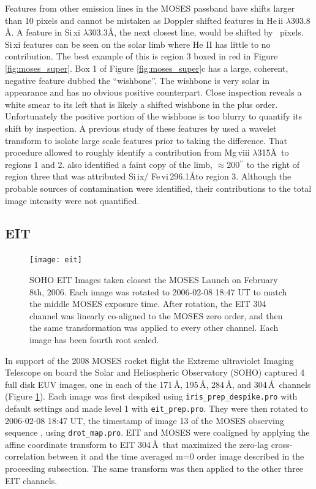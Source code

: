 		
		Features from other emission lines in the MOSES passband have shifts larger than 10 pixels and cannot be mistaken as Doppler shifted features in He\,{\sc ii}  $\lambda303.8$ \AA. 
		A feature in Si\,{\sc xi} $\lambda$303.3\AA, the next closest line, would be shifted by \sixipix\ pixels. 
		Si\,{\sc xi} features can be seen on the solar limb where He II has little to no contribution. 
		The best example of this is region 3 boxed in red in Figure \ref{fig:moses_super}.  
		Box 1 of Figure \ref{fig:moses_super}c has a large, coherent, negative feature dubbed the ``wishbone''.  
		The wishbone is very solar in appearance and has no obvious positive counterpart.  
		Close inspection reveals a white smear to its left that is likely a shifted wishbone in the plus order.  
		Unfortunately the positive portion of the wishbone is too blurry to quantify its shift by inspection. 
		A previous study of these features by \citet{Rust2017} used a wavelet transform to isolate large scale features prior to taking the difference.  
		That procedure allowed \citet{Rust2017} to roughly identify a contribution from Mg\,{\sc viii} $\lambda$315\AA \  to regions 1 and 2.
		\citet{Rust2017} also identified a faint copy of the limb, $\approx$200$^{\prime\prime}$ to the right of region three that was attributed Si\,{\sc ix}/ Fe\,{\sc vi}\,296.1\AA to region 3.
		Although the probable sources of contamination were identified, their contributions to the total image intensity were not quantified.
	
	\subsection{EIT}\label{sec:EIT_data}
		\begin{figure}
			\centering
			\texttt{[image: eit]}
			\caption{SOHO EIT Images taken closest the MOSES Launch on February 8th, 2006. Each image was rotated to 2006-02-08 18:47 UT to match the middle MOSES exposure time.  After rotation, the EIT 304 channel was linearly co-aligned to the MOSES zero order, and then the same transformation was applied to every other channel.  Each image has been fourth root scaled.}
			\label{fig:EIT}
		\end{figure}
	
		In support of the 2008 MOSES rocket flight the Extreme ultraviolet Imaging Telescope \citep[EIT:][]{EIT} on board the Solar and Heliospheric Observatory (SOHO) captured 4 full disk EUV images, one in each of the 171\,\AA, 195\,\AA, 284\,\AA, and 304\,\AA\ channels (Figure \ref{fig:EIT}). 
		Each image was first despiked using \texttt{iris\_prep\_despike.pro} with default settings and made level 1 with \texttt{eit\_prep.pro}. 
		They were then rotated to 2006-02-08 18:47 UT, the timestamp of image 13 of the MOSES observing sequence \citep{Fox2011}, using \texttt{drot\_map.pro}.
		EIT and MOSES were coaligned by applying the affine coordinate transform to EIT 304\,\AA\ that maximized the zero-lag cross-correlation between it and the time averaged m=0 order image described in the proceeding subsection.
		The same transform was then applied to the other three EIT channels.
	 

